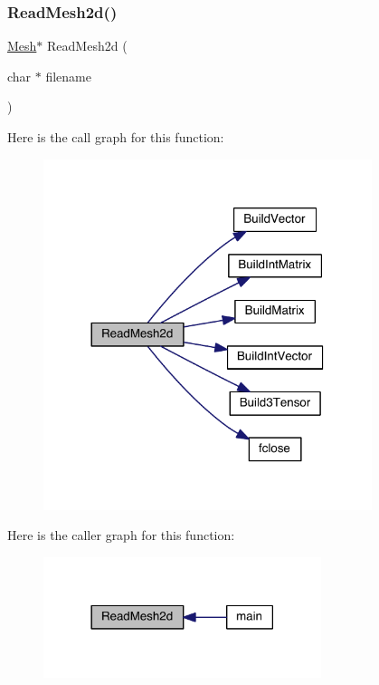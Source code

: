 \subsubsection{\texorpdfstring{Read\+Mesh2d()}{ReadMesh2d()}}
{\footnotesize\ttfamily \hyperlink{a00557_aeffbe0891ab73a4d8964c9cb7978426e}{Mesh}$\ast$ Read\+Mesh2d (\begin{DoxyParamCaption}\item[{char $\ast$}]{filename }\end{DoxyParamCaption})}

Here is the call graph for this function\+:\nopagebreak
\begin{figure}[H]
\begin{center}
\leavevmode
\includegraphics[width=272pt]{a00554_af31fd6654ededed596d98c090d8748b5_cgraph}
\end{center}
\end{figure}
Here is the caller graph for this function\+:\nopagebreak
\begin{figure}[H]
\begin{center}
\leavevmode
\includegraphics[width=230pt]{a00554_af31fd6654ededed596d98c090d8748b5_icgraph}
\end{center}
\end{figure}
\mbox{\label{a00554_a992690ab68b8564681b5a038ca111413}} 
